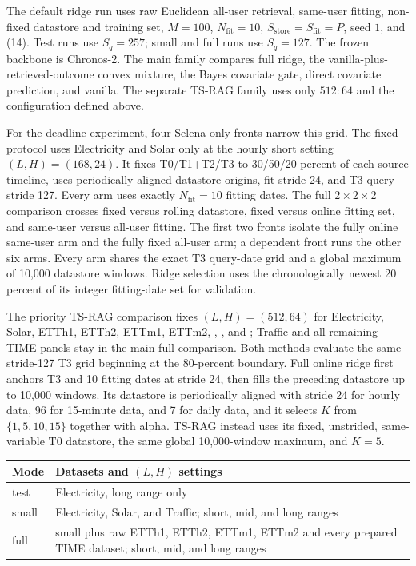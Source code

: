 \documentclass[11pt]{article}
\newcommand{\Nfit}{N_{\mathrm{fit}}}
\newcommand{\Sstore}{S_{\mathrm{store}}}
\newcommand{\Sfit}{S_{\mathrm{fit}}}
\newcommand{\Sq}{S_q}
\begin{document}
The default ridge run uses raw Euclidean all-user retrieval, same-user fitting,
non-fixed datastore and training set, $M=100$, $\Nfit=10$,
$\Sstore=\Sfit=P$, seed $1$, and (14). Test runs use $\Sq=257$; small and full
runs use $\Sq=127$. The frozen backbone is Chronos-2. The main family compares
full ridge, the vanilla-plus-retrieved-outcome convex mixture, the Bayes
covariate gate, direct covariate prediction, and vanilla. The separate TS-RAG
family uses only $512{:}64$ and the configuration defined above.

For the deadline experiment, four Selena-only fronts narrow this grid. The fixed
protocol uses Electricity and Solar only at the hourly short setting
$(L,H)=(168,24)$. It fixes T0/T1+T2/T3 to 30/50/20 percent of each source
timeline, uses periodically aligned datastore origins, fit stride 24, and T3
query stride 127. Every arm uses exactly $\Nfit=10$ fitting dates. The full
$2\times2\times2$ comparison crosses fixed versus rolling
datastore, fixed versus online fitting set, and same-user versus all-user
fitting. The first two fronts isolate the fully online same-user arm and the
fully fixed all-user arm; a dependent front runs the other six arms. Every arm
shares the exact T3 query-date grid and a global maximum of 10,000 datastore
windows. Ridge selection uses the chronologically newest 20 percent of its
integer fitting-date set for validation.

The priority TS-RAG comparison fixes $(L,H)=(512,64)$ for Electricity, Solar,
ETTh1, ETTh2, ETTm1, ETTm2, ,
, and ; Traffic and all remaining
TIME panels stay in the main full comparison. Both methods evaluate the same
stride-127 T3 grid beginning at the 80-percent boundary. Full online ridge
first anchors T3 and 10 fitting dates at stride 24, then fills the preceding
datastore up to 10,000 windows. Its datastore is periodically aligned with
stride 24 for hourly data, 96 for 15-minute data, and 7 for daily data, and it
selects $K$ from $\{1,5,10,15\}$ together with alpha. TS-RAG instead uses its
fixed, unstrided, same-variable T0 datastore, the same global 10,000-window
maximum, and $K=5$.

\begin{center}
\small
\begin{tabularx}{\linewidth}{@{}p{.14\linewidth}X@{}}
\toprule
Mode & Datasets and $(L,H)$ settings \\
\midrule
test & Electricity, long range only \\
small & Electricity, Solar, and Traffic; short, mid, and long ranges \\
full & small plus raw ETTh1, ETTh2, ETTm1, ETTm2 and every prepared TIME
dataset; short, mid, and long ranges \\
\bottomrule
\end{tabularx}
\end{center}
\end{document}
